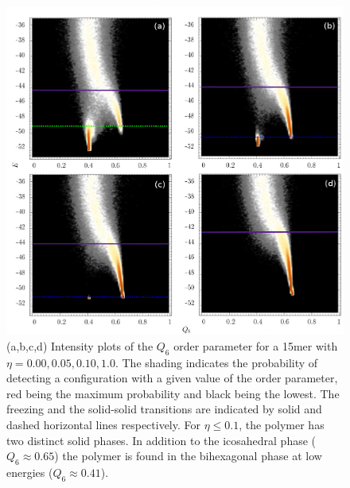\documentclass[12pt]{report}
\begin{document}
%
\begin{figure}
\center
	\includegraphics[width=\textwidth]{chapter6Figs/structuralAnalysis15.eps}
\caption{\label{fig:intensityPlots15}(a,b,c,d) Intensity plots of the
$Q_{6}$ order parameter for a 15mer with $\eta = 0.00, 0.05, 0.10, 1.0$.
The shading indicates the probability of detecting a configuration with a
given value of the order parameter, red being the maximum probability and
black being the lowest. The freezing and the solid-solid transitions are
indicated by solid and dashed horizontal lines respectively. For $\eta \leq
0.1$, the polymer has two distinct solid phases.  In addition to the
icosahedral phase ($Q_{6} \approx 0.65$) the polymer is found in the
bihexagonal phase at low energies ($Q_{6} \approx 0.41$).}
\end{figure}
%
%
\end{document}
